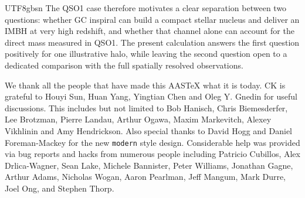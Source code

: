 \documentclass[trackchanges, twocolappendix, twocolumn]{aastex701}
\begin{document}
\begin{CJK*}{UTF8}{gbsn}
The QSO1 case therefore motivates a clear separation between two questions:
whether GC inspiral can build a compact stellar nucleus and deliver an IMBH at
very high redshift, and whether that channel alone can account for the direct
mass measured in QSO1. The present calculation answers the first question
positively for one illustrative halo, while leaving the second question open
to a dedicated comparison with the full spatially resolved observations.

\begin{acknowledgments}
We thank all the people that have made this AASTeX what it is today. CK is grateful to Houyi Sun, Huan Yang, Yingtian Chen and Oleg Y. Gnedin for useful discussions. This
includes but not limited to Bob Hanisch, Chris Biemesderfer, Lee Brotzman,
Pierre Landau, Arthur Ogawa, Maxim Markevitch, Alexey Vikhlinin and Amy
Hendrickson. Also special thanks to David Hogg and Daniel Foreman-Mackey
for the new {\tt\string modern} style design. Considerable help was provided via bug
reports and hacks from numerous people including Patricio Cubillos, Alex
Drlica-Wagner, Sean Lake, Michele Bannister, Peter Williams, Jonathan
Gagne, Arthur Adams, Nicholas Wogan, Aaron Pearlman, Jeff Mangum, Mark Durre, Joel Ong, and Stephen Thorp.
\end{acknowledgments}





\end{CJK*}
\end{document}
